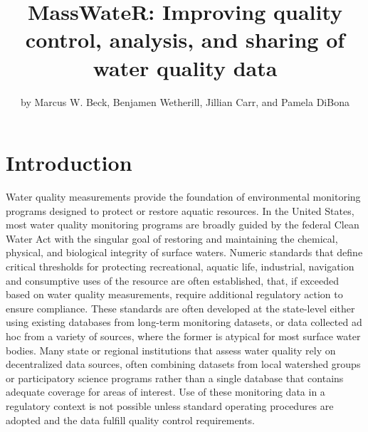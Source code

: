 \title{MassWateR: Improving quality control, analysis, and sharing of water quality data}
\author{by Marcus W. Beck, Benjamen Wetherill, Jillian Carr, and Pamela DiBona}

\maketitle


\hypertarget{introduction}{%
\section{Introduction}\label{introduction}}

Water quality measurements provide the foundation of environmental monitoring programs designed to protect or restore aquatic resources. In the United States, most water quality monitoring programs are broadly guided by the federal Clean Water Act with the singular goal of restoring and maintaining the chemical, physical, and biological integrity of surface waters. Numeric standards that define critical thresholds for protecting recreational, aquatic life, industrial, navigation and consumptive uses of the resource are often established, that, if exceeded based on water quality measurements, require additional regulatory action to ensure compliance. These standards are often developed at the state-level either using existing databases from long-term monitoring datasets, or data collected ad hoc from a variety of sources, where the former is atypical for most surface water bodies. Many state or regional institutions that assess water quality rely on decentralized data sources, often combining datasets from local watershed groups or participatory science programs rather than a single database that contains adequate coverage for areas of interest. Use of these monitoring data in a regulatory context is not possible unless standard operating procedures are adopted and the data fulfill quality control requirements.

